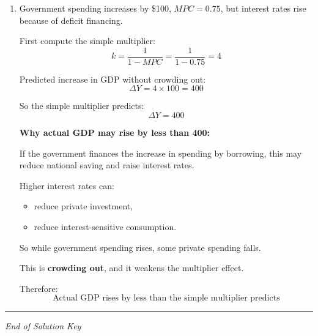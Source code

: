 \documentclass[12pt]{article}
\begin{document}
\begin{enumerate}[label=\textbf{\arabic*.}, start=19]

\item Government spending increases by \$100, \(MPC=0.75\), but interest rates rise because of deficit financing.

First compute the simple multiplier:
\[
k = \frac{1}{1-MPC} = \frac{1}{1-0.75} = 4
\]

Predicted increase in GDP without crowding out:
\[
\Delta Y = 4 \times 100 = 400
\]

So the simple multiplier predicts:
\[
\boxed{\Delta Y = 400}
\]

\textbf{Why actual GDP may rise by less than 400:}

If the government finances the increase in spending by borrowing, this may reduce national saving and raise interest rates.

Higher interest rates can:
\begin{itemize}
    \item reduce private investment,
    \item reduce interest-sensitive consumption.
\end{itemize}

So while government spending rises, some private spending falls.

This is \textbf{crowding out}, and it weakens the multiplier effect.

Therefore:
\[
\boxed{\text{Actual GDP rises by less than the simple multiplier predicts}}
\]

\end{enumerate}

\hrule
\vspace{1em}

\begin{center}
\textit{End of Solution Key}
\end{center}
\end{document}
